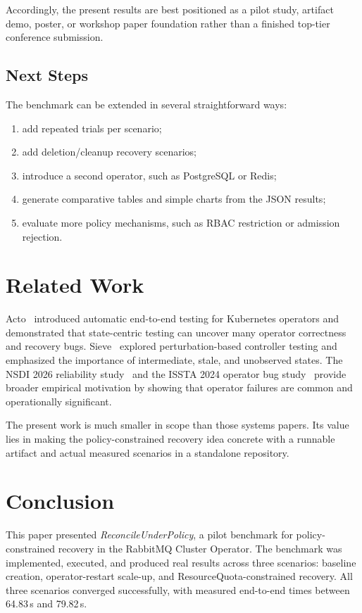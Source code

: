 \documentclass[11pt,a4paper]{article}
\begin{document}
Accordingly, the present results are best positioned as a pilot study, artifact
demo, poster, or workshop paper foundation rather than a finished top-tier
conference submission.

\subsection{Next Steps}

The benchmark can be extended in several straightforward ways:

\begin{enumerate}
  \item add repeated trials per scenario;
  \item add deletion/cleanup recovery scenarios;
  \item introduce a second operator, such as PostgreSQL or Redis;
  \item generate comparative tables and simple charts from the JSON results;
  \item evaluate more policy mechanisms, such as RBAC restriction or admission
  rejection.
\end{enumerate}

\section{Related Work}

Acto~\cite{acto} introduced automatic end-to-end testing for Kubernetes
operators and demonstrated that state-centric testing can uncover many operator
correctness and recovery bugs. Sieve~\cite{sieve} explored perturbation-based
controller testing and emphasized the importance of intermediate, stale, and
unobserved states. The NSDI 2026 reliability study~\cite{watchers} and the
ISSTA 2024 operator bug study~\cite{issta-bugs} provide broader empirical
motivation by showing that operator failures are common and operationally
significant.

The present work is much smaller in scope than those systems papers. Its value
lies in making the policy-constrained recovery idea concrete with a runnable
artifact and actual measured scenarios in a standalone repository.

\section{Conclusion}

This paper presented \emph{ReconcileUnderPolicy}, a pilot benchmark for
policy-constrained recovery in the RabbitMQ Cluster Operator. The benchmark was
implemented, executed, and produced real results across three scenarios:
baseline creation, operator-restart scale-up, and ResourceQuota-constrained
recovery. All three scenarios converged successfully, with measured end-to-end
times between 64.83\,s and 79.82\,s.
\end{document}
